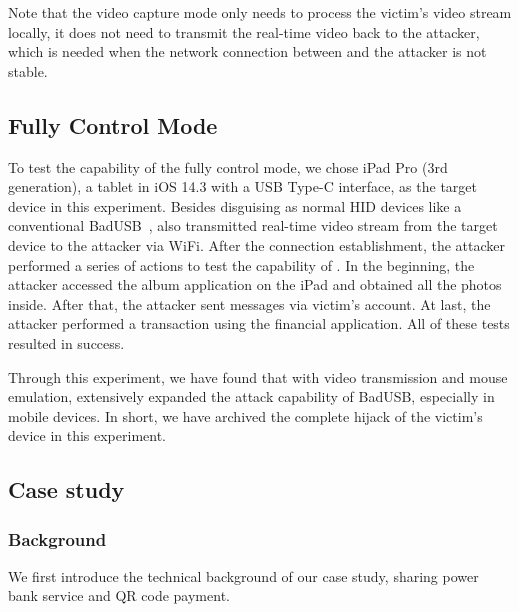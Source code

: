 Note that the video capture mode only needs to
process the victim's video stream locally, it does not need to transmit the real-time video back to the attacker, which is needed when the network connection between \tool and the attacker is not stable.

\subsection{Fully Control Mode}

To test the capability of the fully control mode, we chose iPad Pro (3rd
	generation), a tablet in iOS 14.3 with a USB Type-C interface, as the target
device in this experiment.  Besides disguising as normal HID devices like a
conventional BadUSB~\cite{badusb}, \tool also transmitted real-time video
stream from the target device to the attacker via WiFi.  After the connection
establishment, the attacker performed a series of actions to test the capability of
\tool. In the beginning, the attacker accessed the album application on the iPad and
obtained all the photos inside. After that, the attacker sent messages via victim's
account. At last, the attacker performed a transaction using the
financial application. All of these tests resulted in success.

Through this experiment, we have found that with video transmission and mouse
emulation, \tool extensively expanded the attack capability of BadUSB,
especially in mobile devices. In short, we have archived the complete hijack of the victim's
device in this experiment.

\subsection{Case study}
\label{subsec:case_study}

\subsubsection{Background}

We first introduce the technical background of our case study, sharing power
bank service and QR code payment.

